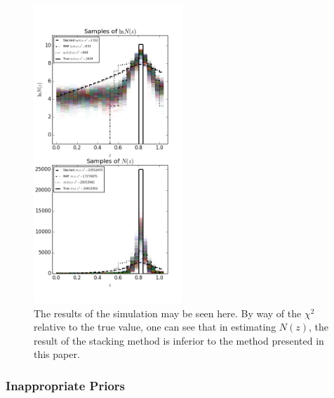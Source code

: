 \documentclass[preprint]{aastex}
\begin{document}
\begin{figure}
\includegraphics[width=0.5\textwidth]{samps-toy.png}
\caption{The results of the simulation may be seen here.  By way of the $\chi^{2}$ relative to the true value, one can see that in estimating $N(z)$, the result of the stacking method is inferior to the method presented in this paper.}
\label{fig:dumbestparam}
\end{figure}



\clearpage
\subsubsection{Inappropriate Priors}
\label{sec:badprior}
\end{document}
